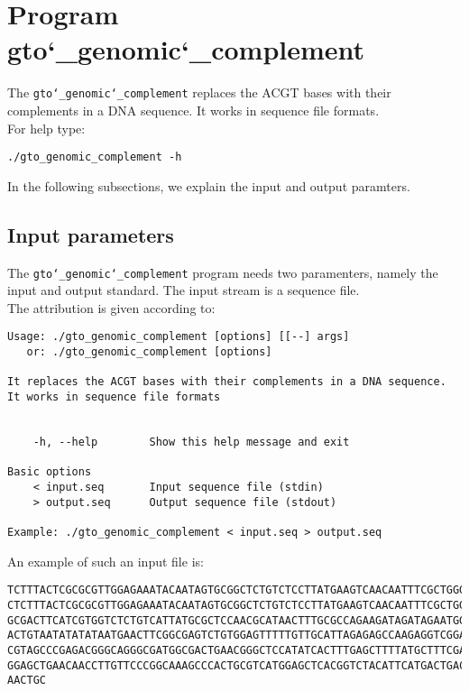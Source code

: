 \section{Program gto\char`_genomic\char`_complement}
The \texttt{gto\char`_genomic\char`_complement} replaces the ACGT bases with their complements in a DNA sequence. It works in sequence file formats.\\
For help type:
\begin{lstlisting}
./gto_genomic_complement -h
\end{lstlisting}
In the following subsections, we explain the input and output paramters.

\subsection*{Input parameters}

The \texttt{gto\char`_genomic\char`_complement}  program needs two paramenters, namely the input and output standard. The input stream is a sequence file.\\
The attribution is given according to:
\begin{lstlisting}
Usage: ./gto_genomic_complement [options] [[--] args]
   or: ./gto_genomic_complement [options]

It replaces the ACGT bases with their complements in a DNA sequence.
It works in sequence file formats


    -h, --help        Show this help message and exit

Basic options
    < input.seq       Input sequence file (stdin)
    > output.seq      Output sequence file (stdout)

Example: ./gto_genomic_complement < input.seq > output.seq
\end{lstlisting}
An example of such an input file is:
\begin{lstlisting}
TCTTTACTCGCGCGTTGGAGAAATACAATAGTGCGGCTCTGTCTCCTTATGAAGTCAACAATTTCGCTGGGACTTGCGG
CTCTTTACTCGCGCGTTGGAGAAATACAATAGTGCGGCTCTGTCTCCTTATGAAGTCAACAATTTCGCTGGGACTTGCG
GCGACTTCATCGTGGTCTCTGTCATTATGCGCTCCAACGCATAACTTTGCGCCAGAAGATAGATAGAATGGTGTAAGAA
ACTGTAATATATATAATGAACTTCGGCGAGTCTGTGGAGTTTTTGTTGCATTAGAGAGCCAAGAGGTCGGACGTCCTCA
CGTAGCCCGAGACGGGCAGGGCGATGGCGACTGAACGGGCTCCATATCACTTTGAGCTTTTATGCTTTCGACTCCTCCA
GGAGCTGAACAACCTTGTTCCCGGCAAAGCCCACTGCGTCATGGAGCTCACGGTCTACATTCATGACTGACTAACCGTA
AACTGC
\end{lstlisting}

